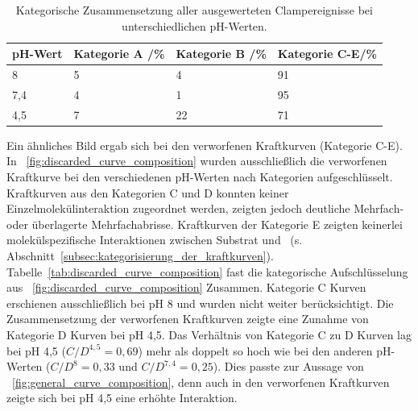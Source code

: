 \begin{table}[H]
	\centering
	\caption[Kategorische Zusammensetzung aller ausgewerteten Clampereignisse]{Kategorische Zusammensetzung aller ausgewerteten Clampereignisse bei unterschiedlichen pH-Werten.}
	\label{tab:general_curve_composition}
	\begin{threeparttable}
		\keepXColumns
		\begin{tabularx}{\textwidth}{X X X X}
			\textbf{pH-Wert}	&	\textbf{Kategorie A /\%}	&	\textbf{Kategorie B /\%}	&	\textbf{Kategorie C-E/\%}	\\
			\toprule
			\toprule
			8	&	5	&	4	&	91	\\
			7,4	&	4	&	1	&	95	\\
			4,5	&	7	&	22	&	71	\\
			\toprule
			\toprule
		\end{tabularx}
	\end{threeparttable}
\end{table}

Ein ähnliches Bild ergab sich bei den verworfenen Kraftkurven (Kategorie C-E). In \abb~\ref{fig:discarded_curve_composition} wurden ausschließlich die verworfenen Kraftkurve bei den verschiedenen pH-Werten nach Kategorien aufgeschlüsselt. Kraftkurven aus den Kategorien C und D konnten keiner Einzelmolekülinteraktion zugeordnet werden, zeigten jedoch deutliche Mehrfach- oder überlagerte Mehrfachabrisse. Kraftkurven der Kategorie E zeigten keinerlei molekülspezifische Interaktionen zwischen Substrat und \spitze~(s. Abschnitt~\ref{subsec:kategorisierung_der_kraftkurven}). Tabelle~\ref{tab:discarded_curve_composition} fast die kategorische Aufschlüsselung aus \abb~\ref{fig:discarded_curve_composition} Zusammen. Kategorie C Kurven erschienen ausschließlich bei pH 8 und wurden nicht weiter berücksichtigt. Die Zusammensetzung der verworfenen Kraftkurven zeigte eine Zunahme von Kategorie D Kurven bei pH 4,5. Das Verhältnis von Kategorie C zu D Kurven lag bei pH 4,5 ($C/D^{4,5} = 0,69$) mehr als doppelt so hoch wie bei den anderen pH-Werten ($C/D^{8} = 0,33$ und $C/D^{7,4} = 0,25$). Dies passte zur Aussage von \abb~\ref{fig:general_curve_composition}, denn auch in den verworfenen Kraftkurven zeigte sich bei pH 4,5 eine erhöhte Interaktion.

